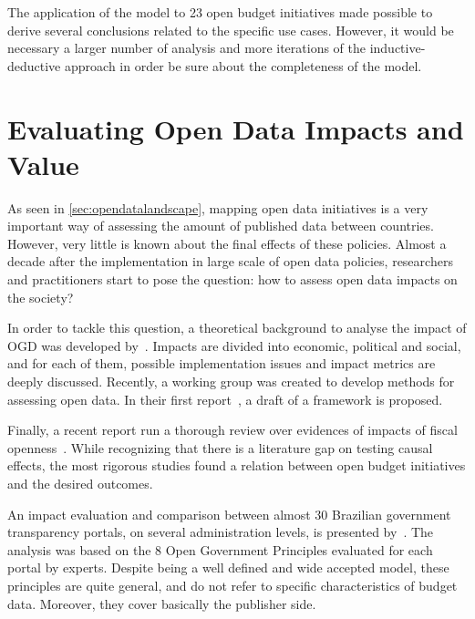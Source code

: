 The application of the model to 23 open budget initiatives made possible to derive several conclusions related to the specific use cases.
However, it would be necessary a larger number of analysis and more iterations of the inductive-deductive approach in order be sure about the completeness of the model.

\section{Evaluating Open Data Impacts and Value}
\label{sec:impacts}

As seen in \autoref{sec:opendatalandscape}, mapping open data initiatives is a very important way of assessing the amount of published data between countries.
However, very little is known about the final effects of these policies.
Almost a decade after the implementation in large scale of open data policies, researchers and practitioners start to pose the question: how to assess open data impacts on the society?

In order to tackle this question, a theoretical background to analyse the impact of OGD was developed by~. 
Impacts are divided into economic, political and social, and for each of them, possible implementation issues and impact metrics are deeply discussed.
Recently, a working group was created to develop methods for assessing open data. In their first report~\cite{Caplan2014}, a draft of a framework is proposed.

Finally, a recent report run a thorough review over evidences of impacts of fiscal openness~\cite{Renzio2015}. While recognizing that there is a literature gap on testing causal effects, the most rigorous studies found a relation between open budget initiatives and the desired outcomes.

An impact evaluation and comparison between almost 30 Brazilian government transparency portals, on several administration levels, is presented by~. The analysis was based on the 8 Open Government Principles evaluated for each portal by experts. Despite being a well defined and wide accepted model, these principles are quite general, and do not refer to specific characteristics of budget data. Moreover, they cover basically the publisher side.


